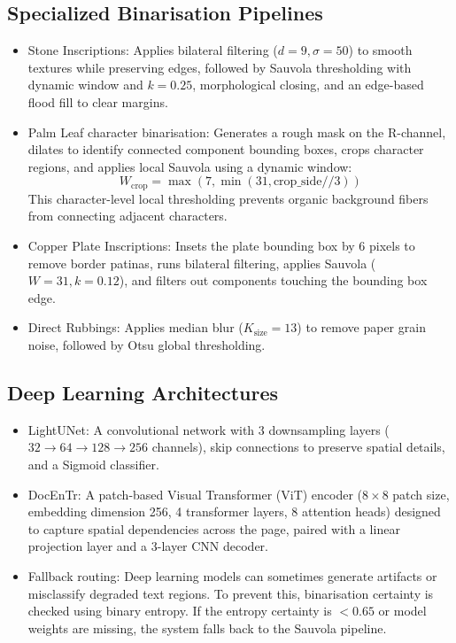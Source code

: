 \subsection{Specialized Binarisation Pipelines}
\begin{itemize}
	\item Stone Inscriptions: Applies bilateral filtering ($d=9, \sigma=50$) to smooth textures while preserving edges, followed by Sauvola thresholding with dynamic window and $k=0.25$, morphological closing, and an edge-based flood fill to clear margins.
	\item Palm Leaf character binarisation: Generates a rough mask on the R-channel, dilates to identify connected component bounding boxes, crops character regions, and applies local Sauvola using a dynamic window:
\begin{equation}
W_{\text{crop}} = \max\left(7, \min\left(31, \text{crop\_side} // 3\right)\right)
\end{equation}
	This character-level local thresholding prevents organic background fibers from connecting adjacent characters.
	\item Copper Plate Inscriptions: Insets the plate bounding box by 6 pixels to remove border patinas, runs bilateral filtering, applies Sauvola ($W=31, k=0.12$), and filters out components touching the bounding box edge.
	\item Direct Rubbings: Applies median blur ($K_{\text{size}}=13$) to remove paper grain noise, followed by Otsu global thresholding.
\end{itemize}

\subsection{Deep Learning Architectures}
\begin{itemize}
	\item LightUNet: A convolutional network with 3 downsampling layers ($32 \rightarrow 64 \rightarrow 128 \rightarrow 256$ channels), skip connections to preserve spatial details, and a Sigmoid classifier.
	\item DocEnTr: A patch-based Visual Transformer (ViT) encoder ($8 \times 8$ patch size, embedding dimension 256, 4 transformer layers, 8 attention heads) designed to capture spatial dependencies across the page, paired with a linear projection layer and a 3-layer CNN decoder.
	\item Fallback routing: Deep learning models can sometimes generate artifacts or misclassify degraded text regions. To prevent this, binarisation certainty is checked using binary entropy. If the entropy certainty is $< 0.65$ or model weights are missing, the system falls back to the Sauvola pipeline.
\end{itemize}

